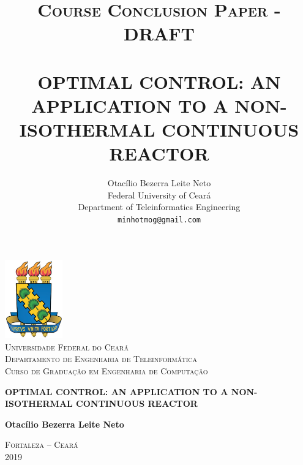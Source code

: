 \documentclass[a4paper,11pt]{book}
\title{ \normalsize \textsc{Course Conclusion Paper - DRAFT} 
        \\[2.0cm]             
        \HRule{0.5pt} \\              
        \LARGE \textbf{\uppercase{Optimal Control: An application to a non-isothermal continuous reactor}}
        \HRule{2pt} \\[0.5cm]  
}
\author{
        Otacílio Bezerra Leite Neto\\   
        Federal University of Ceará\\  
        Department of Teleinformatics Engineering\\
        \texttt{minhotmog@gmail.com} \\
}
\makeatletter
\numberwithin{figure}{chapter}
\numberwithin{equation}{chapter}
\numberwithin{table}{chapter}
\theoremstyle{definition}
\def\printtitle{
    {\centering \@title\par}}
\def\printauthor{
    {\centering \large \@author}}
\makeatother
\begin{document}
%


\thispagestyle{empty}
\begin{center}
    \includegraphics[width=2.5cm]{logo_ufc} \\%
    \textsc{
    Universidade Federal do Cear\'{a} \\%
    Departamento de Engenharia de Teleinform\'{a}tica \\%
    Curso de Gradua\c{c}\~{a}o em Engenharia de Computa\c{c}\~{a}o\\
    }

    \null\vfill%
    \vspace{.5cm}%
        {\LARGE         \textbf{\uppercase{Optimal Control: An application to a non-isothermal continuous reactor}}\\}

    \null\vfill%
    \vspace{.5cm}%

    {\normalsize    \textbf{Otacílio Bezerra Leite Neto}} \\%

    \null\vfill%
    \vspace{.25cm}%

    {\normalsize    \textsc{Fortaleza -- Cear\'{a} \\%
     2019}}
\end{center}
	
\end{document}
